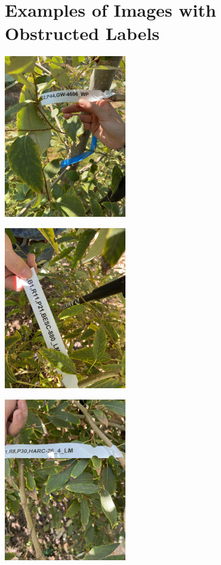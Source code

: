 \documentclass[final,5p,times,twocolumn,authoryear]{elsarticle}
\begin{document}
\section{Examples of Images with Obstructed Labels}
\label{app_blocked}

\begin{center}
    \includegraphics[width=0.40\textwidth]{images/blocked/blocked_leaf.jpg}
\end{center}

\begin{center}
    \includegraphics[width=0.40\textwidth]{images/blocked/blocked_hand.jpg}
\end{center}

\begin{center}
    \includegraphics[width=0.40\textwidth]{images/blocked/blocked_out.jpg}
\end{center}
\end{document}
